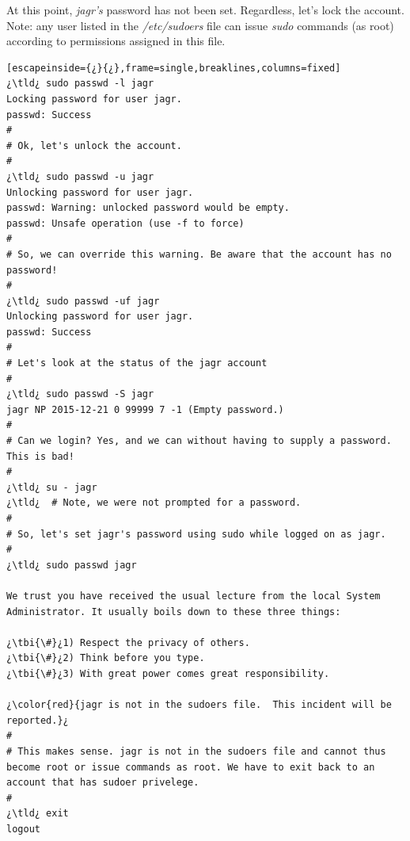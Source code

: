 At this point, \emph{jagr's} password has not been set. Regardless, let's lock the account. Note: any user listed in the \textsl{/etc/sudoers} file can issue \emph{sudo} commands (as root) according to permissions assigned in this file.

\begin{lstlisting}[escapeinside={¿}{¿},frame=single,breaklines,columns=fixed]
¿\tld¿ sudo passwd -l jagr
Locking password for user jagr.
passwd: Success
#
# Ok, let's unlock the account.
#
¿\tld¿ sudo passwd -u jagr
Unlocking password for user jagr.
passwd: Warning: unlocked password would be empty.
passwd: Unsafe operation (use -f to force)
#
# So, we can override this warning. Be aware that the account has no password!
#
¿\tld¿ sudo passwd -uf jagr
Unlocking password for user jagr.
passwd: Success
#
# Let's look at the status of the jagr account
#
¿\tld¿ sudo passwd -S jagr
jagr NP 2015-12-21 0 99999 7 -1 (Empty password.)
#
# Can we login? Yes, and we can without having to supply a password. This is bad!
#
¿\tld¿ su - jagr
¿\tld¿	# Note, we were not prompted for a password.
#
# So, let's set jagr's password using sudo while logged on as jagr.
#
¿\tld¿ sudo passwd jagr

We trust you have received the usual lecture from the local System
Administrator. It usually boils down to these three things:

¿\tbi{\#}¿1) Respect the privacy of others.
¿\tbi{\#}¿2) Think before you type.
¿\tbi{\#}¿3) With great power comes great responsibility.

¿\color{red}{jagr is not in the sudoers file.  This incident will be reported.}¿
#
# This makes sense. jagr is not in the sudoers file and cannot thus become root or issue commands as root. We have to exit back to an account that has sudoer privelege.
#
¿\tld¿ exit
logout


\end{lstlisting}
